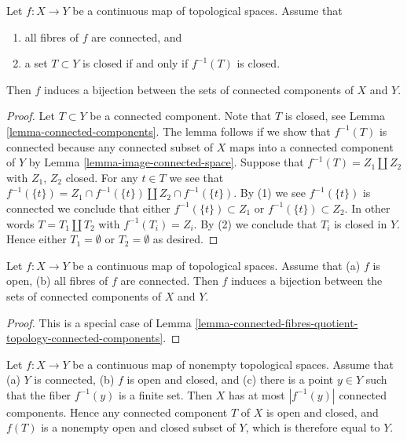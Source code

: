 \begin{lemma}
\label{lemma-connected-fibres-quotient-topology-connected-components}
Let $f : X \to Y$ be a continuous map of topological spaces.
Assume that
\begin{enumerate}
\item all fibres of $f$ are connected, and
\item a set $T \subset Y$ is closed if and only if $f^{-1}(T)$ is closed.
\end{enumerate}
Then $f$ induces a bijection between the sets of connected
components of $X$ and $Y$.
\end{lemma}

\begin{proof}
Let $T \subset Y$ be a connected component.
Note that $T$ is closed, see Lemma \ref{lemma-connected-components}.
The lemma follows if we show that $f^{-1}(T)$ is connected
because any connected subset of $X$ maps into a connected component
of $Y$ by Lemma \ref{lemma-image-connected-space}.
Suppose that $f^{-1}(T) = Z_1 \amalg Z_2$
with $Z_1$, $Z_2$ closed. For any $t \in T$ we see that
$f^{-1}(\{t\}) = Z_1 \cap f^{-1}(\{t\}) \amalg Z_2 \cap f^{-1}(\{t\})$.
By (1) we see $f^{-1}(\{t\})$ is connected we conclude that
either $f^{-1}(\{t\}) \subset Z_1$ or $f^{-1}(\{t\}) \subset Z_2$.
In other words $T = T_1 \amalg T_2$ with $f^{-1}(T_i) = Z_i$.
By (2) we conclude that $T_i$ is closed in $Y$.
Hence either $T_1 = \emptyset$ or $T_2 = \emptyset$ as desired.
\end{proof}

\begin{lemma}
\label{lemma-connected-fibres-connected-components}
Let $f : X \to Y$ be a continuous map of topological spaces.
Assume that
(a) $f$ is open,
(b) all fibres of $f$ are connected.
Then $f$ induces a bijection between the sets of connected
components of $X$ and $Y$.
\end{lemma}

\begin{proof}
This is a special case of
Lemma \ref{lemma-connected-fibres-quotient-topology-connected-components}.
\end{proof}

\begin{lemma}
\label{lemma-finite-fibre-connected-components}
Let $f : X \to Y$ be a continuous map of nonempty topological spaces. Assume
that
(a) $Y$ is connected,
(b) $f$ is open and closed, and
(c) there is a point $y\in Y$ such that the fiber $f^{-1}(y)$ is a finite set.
Then $X$ has at most $|f^{-1}(y)|$ connected components. Hence any connected 
component $T$ of $X$ is open and closed, and $f(T)$ is a nonempty open and 
closed subset of $Y$, which is therefore equal to $Y$.
\end{lemma}


